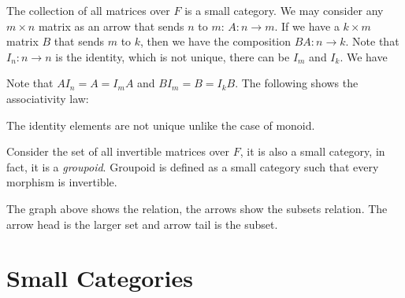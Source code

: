 \begin{example}
  The collection of all matrices over $F$ is a small category. We may consider any $m \times n$ matrix as an arrow that sends $n$ to $m$: $A \colon n \to m$. If we have a $k \times m$ matrix $B$ that sends $m$ to $k$, then we have the composition $BA \colon n \to k$. Note that $I_n \colon n \to n$ is the identity, which is not unique, there can be $I_m$ and $I_k$. We have
  \begin{center}
  \end{center}
  Note that $A I_n = A = I_m A$ and $B I_m = B = I_k B$. The following shows the associativity law:
  \begin{center}
  \end{center}
\end{example}
\begin{remark}
  The identity elements are not unique unlike the case of monoid.
\end{remark}

Consider the set of all invertible matrices over $F$, it is also a small category, in fact, it is a \emph{groupoid}. Groupoid is defined as a small category such that every morphism is invertible.

\begin{center}
\end{center}
The graph above shows the relation, the arrows show the subsets relation. The arrow head is the larger set and arrow tail is the subset.

\section{Small Categories}

